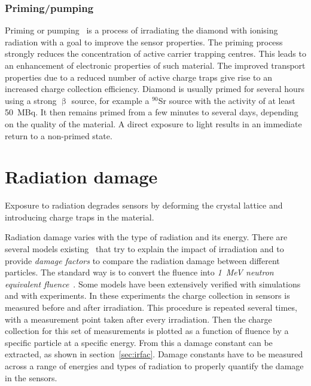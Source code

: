 \subsubsection{Priming/pumping}
Priming or pumping~\cite{pumping:00000} is a process of irradiating the diamond with ionising radiation with a goal to improve the sensor properties. The priming process strongly reduces the concentration of active carrier trapping centres. This leads to an enhancement of electronic properties of such material. The improved transport properties due to a reduced number of active charge traps give rise to an increased charge collection efficiency. Diamond is usually primed for several hours using a strong $\upbeta$ source, for example a $^{90}$Sr source with the activity of at least 50~MBq. It then remains primed from a few minutes to several days, depending on the quality of the material. A direct exposure to light results in an immediate return to a non-primed state.



\section{Radiation damage}
\label{sec:raddam}
Exposure to radiation degrades sensors by deforming the crystal lattice and introducing charge traps in the material. 

Radiation damage varies with the type of radiation and its energy. There are several models existing~\cite{2002NIMPA,Guthoff:2014223} that try to explain the impact of irradiation and to provide \emph{damage factors} to compare the radiation damage between different particles. The standard way is to convert the fluence into \emph{1~MeV neutron equivalent fluence}~\cite{NEQ:00000}. Some models have been extensively verified with simulations and with experiments. In these experiments the charge collection in sensors is measured before and after irradiation. This procedure is repeated several times, with a measurement point taken after every irradiation. Then the charge collection for this set of measurements is plotted as a function of fluence by a specific particle at a specific energy. From this a damage constant can be extracted, as shown in section~\ref{sec:irfac}. Damage constants have to be measured across a range of energies and types of radiation to properly quantify the damage in the sensors. %

